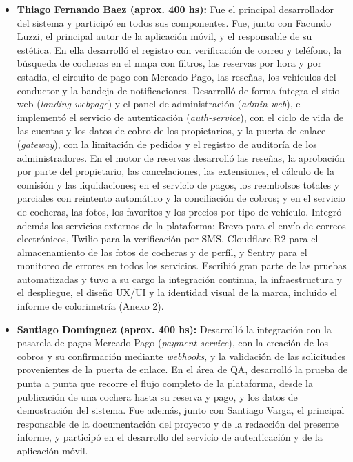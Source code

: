 \begin{itemize}
    \item \textbf{Thiago Fernando Baez (aprox. 400 hs):}
    Fue el principal desarrollador del sistema y participó en todos sus componentes. Fue, junto con Facundo Luzzi, el principal autor de la aplicación móvil, y el responsable de su estética. En ella desarrolló el registro con verificación de correo y teléfono, la búsqueda de cocheras en el mapa con filtros, las reservas por hora y por estadía, el circuito de pago con Mercado Pago, las reseñas, los vehículos del conductor y la bandeja de notificaciones. Desarrolló de forma íntegra el sitio web (\textit{landing-webpage}) y el panel de administración (\textit{admin-web}), e implementó el servicio de autenticación (\textit{auth-service}), con el ciclo de vida de las cuentas y los datos de cobro de los propietarios, y la puerta de enlace (\textit{gateway}), con la limitación de pedidos y el registro de auditoría de los administradores. En el motor de reservas desarrolló las reseñas, la aprobación por parte del propietario, las cancelaciones, las extensiones, el cálculo de la comisión y las liquidaciones; en el servicio de pagos, los reembolsos totales y parciales con reintento automático y la conciliación de cobros; y en el servicio de cocheras, las fotos, los favoritos y los precios por tipo de vehículo. Integró además los servicios externos de la plataforma: Brevo para el envío de correos electrónicos, Twilio para la verificación por SMS, Cloudflare R2 para el almacenamiento de las fotos de cocheras y de perfil, y Sentry para el monitoreo de errores en todos los servicios. Escribió gran parte de las pruebas automatizadas y tuvo a su cargo la integración continua, la infraestructura y el despliegue, el diseño UX/UI y la identidad visual de la marca, incluido el informe de colorimetría (\hyperref[anexo:colorimetria]{Anexo 2}).

    \item \textbf{Santiago Domínguez (aprox. 400 hs):}
    Desarrolló la integración con la pasarela de pagos Mercado Pago (\textit{payment-service}), con la creación de los cobros y su confirmación mediante \textit{webhooks}, y la validación de las solicitudes provenientes de la puerta de enlace. En el área de QA, desarrolló la prueba de punta a punta que recorre el flujo completo de la plataforma, desde la publicación de una cochera hasta su reserva y pago, y los datos de demostración del sistema. Fue además, junto con Santiago Varga, el principal responsable de la documentación del proyecto y de la redacción del presente informe, y participó en el desarrollo del servicio de autenticación y de la aplicación móvil.


\end{itemize}
